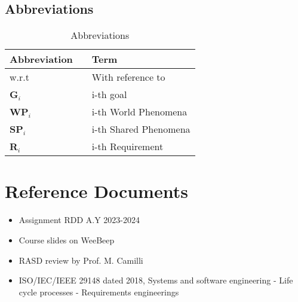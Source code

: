 \subsection{Abbreviations}
\begin{table}[H]
    \centering
    \renewcommand{\arraystretch}{1.5} 
    \begin{tabular}{l l p{10.5cm}}
    \hline
        \textbf{Abbreviation}   & & \textbf{Term} \\                                                                                                
    \hline
        w.r.t                   & & With reference to \\                                                                                                
        \textbf{G}\(_i\)        & & i-th goal \\ 
        \textbf{WP}\(_i\)       & & i-th World Phenomena \\ 
        \textbf{SP}\(_i\)       & & i-th Shared Phenomena \\ 
        \textbf{R}\(_i\)        & & i-th Requirement \\ 
    \hline
    \end{tabular}
    \caption{Abbreviations}
\end{table}

\section{Reference Documents}
\begin{itemize}
    \item Assignment RDD A.Y 2023-2024
    \item Course slides on WeeBeep
    \item RASD review by Prof. M. Camilli
    \item ISO/IEC/IEEE 29148 dated 2018, Systems and software engineering - Life cycle processes - Requirements engineerings
\end{itemize}

